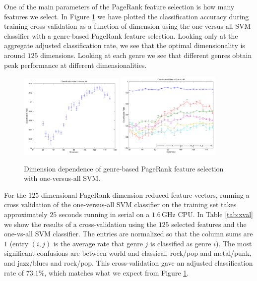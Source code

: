 \documentclass[12pt]{article}
\begin{document}
One of the main parameters of the PageRank feature selection is how many features we select.  In Figure \ref{fig:prDim} we have plotted the classification accuracy during training cross-validation as a function of dimension using the one-versus-all SVM classifier with a genre-based PageRank feature selection.  Looking only at the aggregate adjusted classification rate, we see that the optimal dimensionality is around $125$ dimensions.  Looking at each genre we see that different genres obtain peak performance at different dimensionalities.

\begin{figure}[h!]
   \centering
   \includegraphics[width=0.45\textwidth]{figures/optimSVMOVAprDim_genre05_Dale.pdf}
   \includegraphics[width=0.45\textwidth]{figures/optimSVMOVAprDimClass_Dale.pdf}
   \caption{Dimension dependence of genre-based PageRank feature selection with one-versus-all SVM.}
   \label{fig:prDim}
\end{figure}

For the $125$ dimensional PageRank dimension reduced feature vectors, running a cross validation of the one-versus-all SVM classifier on the training set takes approximately $25$ seconds running in serial on a $1.6\,\text{GHz}$ CPU.  In Table \ref{tab:xval} we show the results of a cross-validation using the $125$ selected features and the one-vs-all SVM classifier.  The entries are normalized so that the column sums are $1$ (entry $(i,j)$ is the average rate that genre $j$ is classified as genre $i$).  The most significant confusions are between world and classical, rock/pop and metal/punk, and jazz/blues and rock/pop.  This cross-validation gave an adjusted classification rate of $73.1\%$, which matches what we expect from Figure \ref{fig:prDim}.\\
\end{document}
